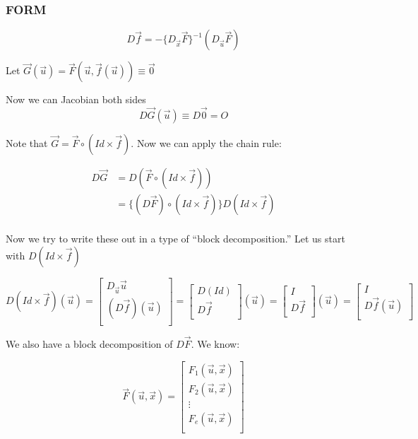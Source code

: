 \documentclass [12 pt, twoside] {book}
\newcommand\+{\text{ }}
\begin{document}
\subsubsection{FORM}

$$D \vec{f} = -\{D_{\vec{x}} \vec{F}\}^{-1} (D_{\vec{u}} \vec{F})$$

Let $\vec{G}(\vec{u}) = \vec{F}(\vec{u}, \vec{f}(\vec{u})) \equiv \vec{0}$

Now we can Jacobian both sides
$$D\vec{G}(\vec{u}) \equiv D\vec{0} = O$$

Note that $\vec{G} = \vec{F} \circ (Id \times \vec{f})$. Now we can apply the
chain rule:

\begin{align*}
    D\vec{G} &= D(\vec{F} \circ (Id \times \vec{f}))\\
             &= \{(D\vec{F}) \circ (Id \times \vec{f})\} D(Id \times \vec{f})\\
\end{align*}

Now we try to write these out in a type of ``block decomposition.'' Let us start
with $D(Id \times \vec{f})$

\[
    D(Id \times \vec{f})(\vec{u}) = \left[\begin{array}{c}
                D_{\vec{u}}\vec{u} \\
                (D\vec{f})(\vec{u}) \\
             \end{array}\right]
             = \left[\begin{array}{c}
                     D(Id) \\
                     D\vec{f}\\
             \end{array}\right](\vec{u})
             = \left[\begin{array}{c}
                 I \\
                 D\vec{f}\\
             \end{array}\right] (\vec{u})
             =  \left[\begin{array}{c}
                I \\
                D\vec{f} (\vec{u})\\
             \end{array}\right]
\]

We also have a block decomposition of $D\vec{F}$. We know:

\[
    \vec{F}(\vec{u}, \vec{x}) = \left[\begin{array}{c}
            F_1(\vec{u}, \vec{x}) \\
            F_2(\vec{u}, \vec{x}) \\
            \vdots \\
            F_e(\vec{u}, \vec{x}) \\
    \end{array}\right]
\]
\end{document}
